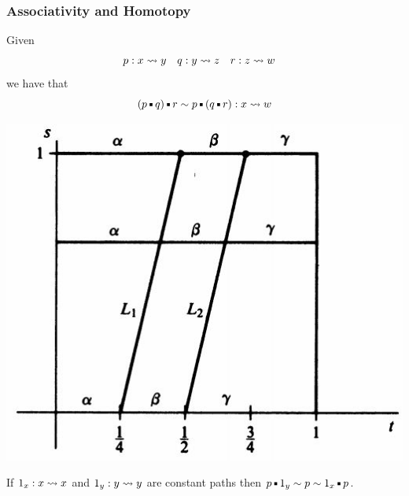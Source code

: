 \documentclass[handout]{beamer} %
\begin{document}

\begin{frame}
  \frametitle{Associativity and Homotopy}
  \small
  Given 
  \begin{align*}
    p &: x \rightsquigarrow y
    &
    q &: y \rightsquigarrow z
    &
    r &: z \rightsquigarrow w
  \end{align*}
  we have that
  \[
    (p \Concat q) \Concat r \sim p \Concat (q \Concat r) : x \Path w
  \]

  \begin{center}
    \includegraphics[scale=0.3]{assoc.jpg}
  \end{center}
  
  If $1_x : x \rightsquigarrow x$ and $1_y : y \rightsquigarrow y$ are constant paths then
  $
    p \Concat 1_y \sim p \sim 1_x \Concat p
  $.
\end{frame}
\end{document}
